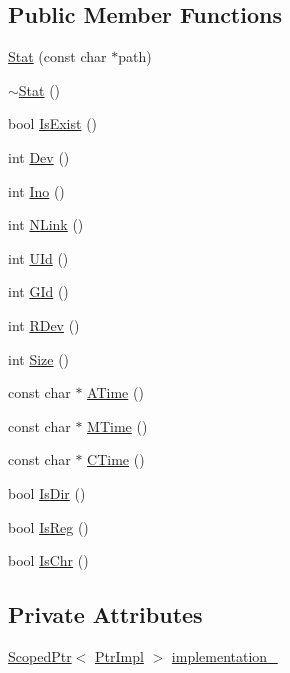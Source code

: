 \subsection*{Public Member Functions}
\begin{DoxyCompactItemize}
\item 
\hyperlink{classmocha_1_1_stat_a71be9fa6489f96ee32ddbee87be57444}{Stat} (const char $\ast$path)
\item 
\hyperlink{classmocha_1_1_stat_a90c04a2bd878ce1de02e0e07053e1f2e}{$\sim$Stat} ()
\item 
bool \hyperlink{classmocha_1_1_stat_ac36c5cfdd904956d2ee735e6f5cb1df8}{IsExist} ()
\item 
int \hyperlink{classmocha_1_1_stat_a8a69994a56ac9996cb39067ad39071a6}{Dev} ()
\item 
int \hyperlink{classmocha_1_1_stat_a41de52fa20fb5e742feb37e72abda4d3}{Ino} ()
\item 
int \hyperlink{classmocha_1_1_stat_a6e6b1bd4775156dbd411bbe5fb5fcfef}{NLink} ()
\item 
int \hyperlink{classmocha_1_1_stat_a8b6107e6387d44ede3669d1b8b3bd665}{UId} ()
\item 
int \hyperlink{classmocha_1_1_stat_a26647bb3fdaaab61aa6a7f79696e8edd}{GId} ()
\item 
int \hyperlink{classmocha_1_1_stat_ae0c7bb4dbe9c4d52a1e7b96eba490ba0}{RDev} ()
\item 
int \hyperlink{classmocha_1_1_stat_a2c603f6803d41951bbef40aff4862cc0}{Size} ()
\item 
const char $\ast$ \hyperlink{classmocha_1_1_stat_a447dfc72c219a969c99f2aa3ec93eded}{ATime} ()
\item 
const char $\ast$ \hyperlink{classmocha_1_1_stat_a8364473cf0c50adbd44a2384308e4bfc}{MTime} ()
\item 
const char $\ast$ \hyperlink{classmocha_1_1_stat_a3706084b773f31639d520e87ac70c341}{CTime} ()
\item 
bool \hyperlink{classmocha_1_1_stat_ad08fa668cee3e082573469fafa25746d}{IsDir} ()
\item 
bool \hyperlink{classmocha_1_1_stat_a368b3b61e47e99c5ca49878b3baaad44}{IsReg} ()
\item 
bool \hyperlink{classmocha_1_1_stat_a46f44bcc58d9755e6ac491bff5955fe6}{IsChr} ()
\end{DoxyCompactItemize}
\subsection*{Private Attributes}
\begin{DoxyCompactItemize}
\item 
\hyperlink{classmocha_1_1_scoped_ptr}{ScopedPtr}$<$ \hyperlink{classmocha_1_1_stat_1_1_ptr_impl}{PtrImpl} $>$ \hyperlink{classmocha_1_1_stat_a4e2e164982b1652f72667966112dddfa}{implementation\_\-}
\end{DoxyCompactItemize}



